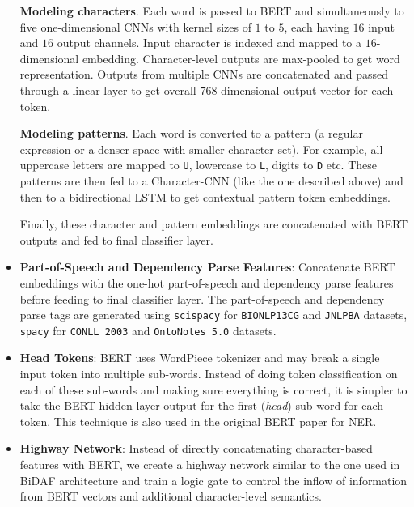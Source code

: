 \begin{itemize}
    \textbf{Modeling characters}. Each word is passed to BERT and simultaneously to five one-dimensional CNNs with kernel sizes of $1$ to $5$, each having $16$ input and $16$ output channels. Input character is indexed and mapped to a $16$-dimensional embedding. Character-level outputs are max-pooled to get word representation. Outputs from multiple CNNs are concatenated and passed through a linear layer to get overall $768$-dimensional output vector for each token.
    
    \textbf{Modeling patterns}. Each word is converted to a pattern (a regular expression or a denser space with smaller character set). For example, all uppercase letters are mapped to \texttt{U}, lowercase to \texttt{L}, digits to \texttt{D} etc. These patterns are then fed to a Character-CNN (like the one described above) and then to a bidirectional LSTM to get contextual pattern token embeddings.
    
    Finally, these character and pattern embeddings are concatenated with BERT outputs and fed to final classifier layer.
    
    \item \textbf{Part-of-Speech and Dependency Parse Features}: Concatenate BERT embeddings with the one-hot part-of-speech and dependency parse features before feeding to final classifier layer. The part-of-speech and dependency parse tags are generated using \texttt{scispacy} for \texttt{BIONLP13CG} and \texttt{JNLPBA} datasets, \texttt{spacy} for \texttt{CONLL 2003} and \texttt{OntoNotes 5.0} datasets.
    
    \item \textbf{Head Tokens}: BERT uses WordPiece tokenizer and may break a single input token into multiple sub-words. Instead of doing token classification on each of these sub-words and making sure everything is correct, it is simpler to take the BERT hidden layer output for the first (\textit{head}) sub-word for each token. This technique is also used in the original BERT paper\cite{devlin2018bert} for NER.
    
    \item \textbf{Highway Network}: Instead of directly concatenating character-based features with BERT, we create a highway network\cite{srivastava2015highway} similar to the one used in BiDAF\cite{seo2016bidirectional} architecture and train a logic gate to control the inflow of information from BERT vectors and additional character-level semantics.
\end{itemize}

